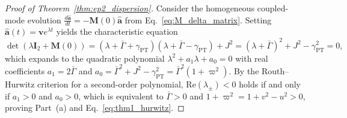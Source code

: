 \documentclass[11pt,letterpaper]{article}
\theoremstyle{definition}
\theoremstyle{remark}
\begin{document}
\begin{proof}[Proof of Theorem~\ref{thm:ep2_dispersion}]
Consider the homogeneous coupled-mode evolution $\frac{d\hat{\mathbf{a}}}{dt} = -\mathbf{M}(0)\hat{\mathbf{a}}$ from Eq.~\eqref{eq:M_delta_matrix}. Setting $\hat{\mathbf{a}}(t) = \mathbf{v}e^{\lambda t}$ yields the characteristic equation
\begin{equation}
\det(\lambda\mathbf{I}_2 + \mathbf{M}(0)) = (\lambda + \bar{\Gamma} + \gamma_{\mathrm{PT}})(\lambda + \bar{\Gamma} - \gamma_{\mathrm{PT}}) + J^2 = (\lambda + \bar{\Gamma})^2 + J^2 - \gamma_{\mathrm{PT}}^2 = 0,
\label{eq:appA_char}
\end{equation}
which expands to the quadratic polynomial $\lambda^2 + a_1 \lambda + a_0 = 0$ with real coefficients $a_1 = 2\bar{\Gamma}$ and $a_0 = \bar{\Gamma}^2 + J^2 - \gamma_{\mathrm{PT}}^2 = \bar{\Gamma}^2(1 + \varpi^2)$. By the Routh--Hurwitz criterion for a second-order polynomial, $\mathrm{Re}(\lambda_\pm) < 0$ holds if and only if $a_1 > 0$ and $a_0 > 0$, which is equivalent to $\bar{\Gamma} > 0$ and $1 + \varpi^2 = 1 + v^2 - u^2 > 0$, proving Part~(a) and Eq.~\eqref{eq:thm1_hurwitz}.


\end{proof}
\end{document}
